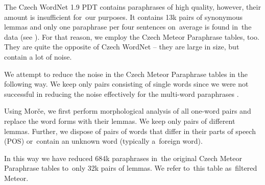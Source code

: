 The Czech WordNet 1.9 PDT contains paraphrases of high quality, however, their amount is 
insufficient for~our purposes. It contains 13k pairs of synonymous lemmas and only one 
paraphrase per four sentences on~average is found in~the data (see ).  
For that reason, we employ the Czech Meteor Paraphrase tables, too. They are quite the 
opposite of Czech WordNet -- they are large in size, but contain a lot of noise.

We attempt to reduce the noise in the Czech Meteor Paraphrase tables in the following way. We 
keep only pairs consisting of single words since we were not successful in reducing the noise
effectively for the multi-word paraphrases \cite{barancikova2014}. 

Using Morče, we first perform morphological analysis of all one-word pairs and replace 
the word forms with their lemmas.  We keep only pairs of different lemmas. Further, we
 dispose of pairs of words that differ in their parts of speech (POS) or~contain an 
unknown word (typically a~foreign word). 

In this way we have reduced 684k paraphrases in~the original Czech Meteor Paraphrase tables 
to~only 32k pairs of lemmas. We refer to~this table as~filtered Meteor.

